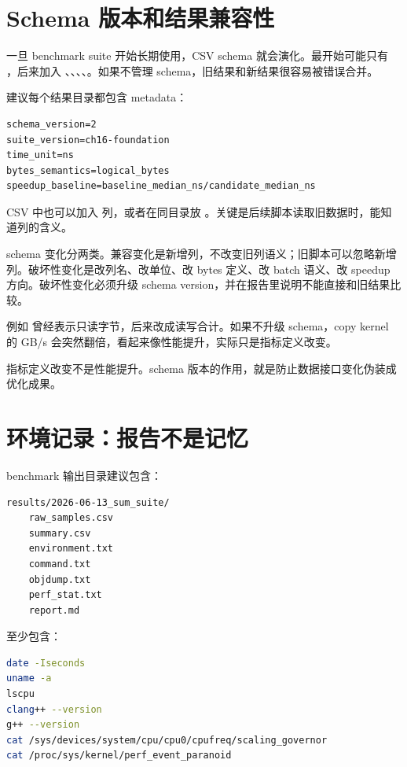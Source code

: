 \section{Schema 版本和结果兼容性}

一旦 benchmark suite 开始长期使用，CSV schema 就会演化。最开始可能只有 ，后来加入 、、、、。如果不管理 schema，旧结果和新结果很容易被错误合并。

建议每个结果目录都包含 metadata：

\begin{lstlisting}
schema_version=2
suite_version=ch16-foundation
time_unit=ns
bytes_semantics=logical_bytes
speedup_baseline=baseline_median_ns/candidate_median_ns
\end{lstlisting}

CSV 中也可以加入  列，或者在同目录放 。关键是后续脚本读取旧数据时，能知道列的含义。

schema 变化分两类。兼容变化是新增列，不改变旧列语义；旧脚本可以忽略新增列。破坏性变化是改列名、改单位、改 bytes 定义、改 batch 语义、改 speedup 方向。破坏性变化必须升级 schema version，并在报告里说明不能直接和旧结果比较。

例如  曾经表示只读字节，后来改成读写合计。如果不升级 schema，copy kernel 的 GB/s 会突然翻倍，看起来像性能提升，实际只是指标定义改变。

\begin{warningbox}
指标定义改变不是性能提升。schema 版本的作用，就是防止数据接口变化伪装成优化成果。
\end{warningbox}

\section{环境记录：报告不是记忆}

benchmark 输出目录建议包含：

\begin{lstlisting}
results/2026-06-13_sum_suite/
    raw_samples.csv
    summary.csv
    environment.txt
    command.txt
    objdump.txt
    perf_stat.txt
    report.md
\end{lstlisting}

 至少包含：

\begin{lstlisting}[language=bash]
date -Iseconds
uname -a
lscpu
clang++ --version
g++ --version
cat /sys/devices/system/cpu/cpu0/cpufreq/scaling_governor
cat /proc/sys/kernel/perf_event_paranoid
\end{lstlisting}

